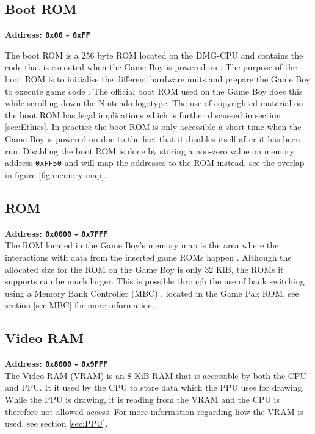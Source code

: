 \subsection{Boot ROM}
\textbf{Address: \texttt{0x00} - \texttt{0xFF}}

The boot ROM is a 256 byte ROM located on the DMG-CPU and contains the code that is executed when the Game Boy is powered on \cite{BootRom}. The purpose of the boot ROM is to initialise the different hardware units and prepare the Game Boy to execute game code \cite{bootstraptechopedia}. The official boot ROM used on the Game Boy does this while scrolling down the Nintendo logotype. The use of copyrighted material on the boot ROM has legal implications which is further discussed in section \ref{sec:Ethics}.
In practice the boot ROM is only accessible a short time when the Game Boy is powered on due to the fact that it disables itself after it has been run. 
Disabling the boot ROM is done by storing a non-zero value on memory address \texttt{0xFF50} and will map the addresses to the ROM instead, see the overlap in figure \ref{fig:memory-map}.

\subsection{ROM}
\textbf{Address: \texttt{0x0000} - \texttt{0x7FFF}}
\\
The ROM located in the Game Boy's memory map is the area where the interactions with data from the inserted game ROMs happen \cite{pandocsmemorymap}. 
Although the allocated size for the ROM on the Game Boy is only 32 KiB, the ROMs it supports can be much larger. This is possible through the use of bank switching using a Memory Bank Controller (MBC) \cite{pandocsexternalmemoryandhardware}, located in the Game Pak ROM, see section \ref{sec:MBC} for more information.

\subsection{Video RAM}
\textbf{Address: \texttt{0x8000} - \texttt{0x9FFF}}
\\
The Video RAM (VRAM) is an 8 KiB RAM \cite{pandocsmemorymap} that is accessible by both the CPU and PPU. 
It it used by the CPU to store data which the PPU uses for drawing. 
While the PPU is drawing, it is reading from the VRAM and the CPU is therefore not allowed access. 
For more information regarding how the VRAM is used, see section \ref{sec:PPU}.


